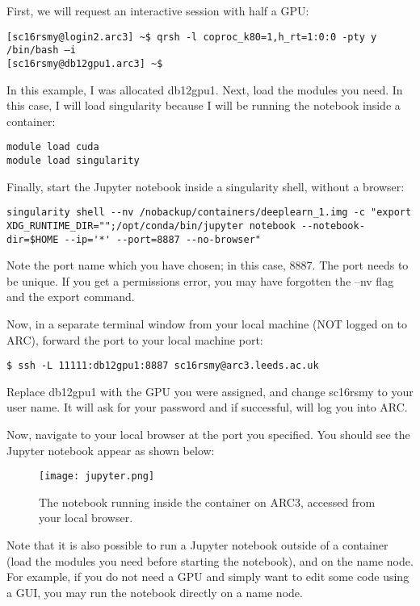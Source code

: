 \documentclass[]{article}
\begin{document}
First, we will request an interactive session with half a GPU:

\begin{lstlisting}
[sc16rsmy@login2.arc3] ~$ qrsh -l coproc_k80=1,h_rt=1:0:0 -pty y /bin/bash –i
[sc16rsmy@db12gpu1.arc3] ~$
\end{lstlisting}

In this example, I was allocated db12gpu1. Next, load the modules you need. In this case, I will load singularity because I will be running the notebook inside a container:

\begin{lstlisting}
module load cuda
module load singularity
\end{lstlisting}

Finally, start the Jupyter notebook inside a singularity shell, without a browser:

\begin{lstlisting}
singularity shell --nv /nobackup/containers/deeplearn_1.img -c "export XDG_RUNTIME_DIR="";/opt/conda/bin/jupyter notebook --notebook-dir=$HOME --ip='*' --port=8887 --no-browser"
\end{lstlisting}

Note the port name which you have chosen; in this case, 8887. The port needs to be unique. If you get a permissions error, you may have forgotten the --nv flag and the export command. 

Now, in a separate terminal window from your local machine (NOT logged on to ARC), forward the port to your local machine port:

\begin{lstlisting}
$ ssh -L 11111:db12gpu1:8887 sc16rsmy@arc3.leeds.ac.uk
\end{lstlisting}

Replace db12gpu1 with the GPU you were assigned, and change sc16rsmy to your user name. It will ask for your password and if successful, will log you into ARC.

Now, navigate to your local browser at the port you specified. You should see the Jupyter notebook appear as shown below:

\begin{figure}[H]
	\texttt{[image: jupyter.png]}
	\caption{The notebook running inside the container on ARC3, accessed from your local browser.}
\end{figure}

Note that it is also possible to run a Jupyter notebook outside of a container (load the modules you need before starting the notebook), and on the name node. For example, if you do not need a GPU and simply want to edit some code using a GUI, you may run the notebook directly on a name node. 
\end{document}
